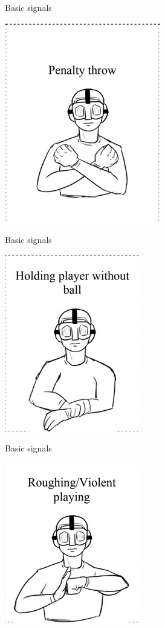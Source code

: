 \documentclass{beamer}
\begin{document}
    \begin{frame}{Basic signals}
        \begin{center}
            \includegraphics[scale=0.8]{penaltyShotSignal}
        \end{center}
    \end{frame}

    \begin{frame}{Basic signals}
        \begin{center}
            \includegraphics[scale=0.8]{holdingSignal}
        \end{center}
    \end{frame}

    \begin{frame}{Basic signals}
        \begin{center}
            \includegraphics[scale=0.8]{violentGameSignal}
        \end{center}
    \end{frame}
\end{document}
